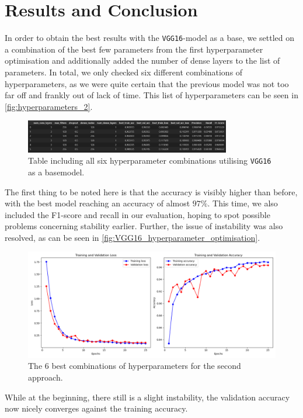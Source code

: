 \chapter{Results and Conclusion}

In order to obtain the best results with the \texttt{VGG16}-model as a base, we settled on a combination of the best few parameters from the first hyperparameter optimisation
and additionally added the number of dense layers to the list of parameters.
In total, we only checked six different combinations of hyperparameters, as we were quite certain that the previous model was not too far off and frankly out of lack of time.
This list of hyperparameters can be seen in \autoref{fig:hyperparameters_2}.

\begin{figure}[H]
    \centering
    \includegraphics[width=0.8\textwidth]{images/VGG16_hyperparameter.png}
    \caption{Table including all six hyperparameter combinations utilising \texttt{VGG16} as a basemodel.}
    \label{fig:hyperparameters_2}
\end{figure}

The first thing to be noted here is that the accuracy is visibly higher than before, with the best model reaching an accuracy of almost $97 \%$.
This time, we also included the F1-score and recall in our evaluation, hoping to spot possible problems concerning stability earlier.
Further, the issue of instability was also resolved, as can be seen in \autoref{fig:VGG16_hyperparameter_optimisation}.

\begin{figure}[H]
    \centering
    \includegraphics[width=\textwidth]{images/VGG16_best_parameters.png}
    \caption{The $6$ best combinations of hyperparameters for the second approach.}
    \label{fig:VGG16_hyperparameter_optimisation}
\end{figure}

While at the beginning, there still is a slight instability, the validation accuracy now nicely converges against the training accuracy. 

